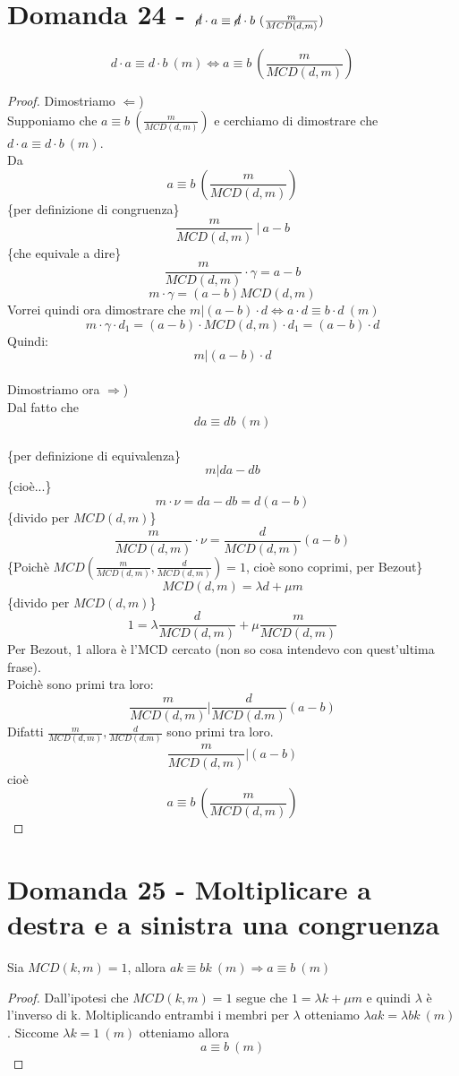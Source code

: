 \documentclass[]{article}
\begin{document}
\section{Domanda 24 - $\cancel{d}\cdot a \equiv \cancel{d} \cdot b\ (\frac{m}{MCD(d,m)})$}
$$d\cdot a \equiv d \cdot b \ (m) \Leftrightarrow a \equiv b \ \left( \frac{m}{MCD(d,m)} \right)$$
\begin{proof}
Dimostriamo $\Leftarrow$)\\
Supponiamo che $a \equiv b \ \left( \frac{m}{MCD(d,m)} \right)$ e cerchiamo di dimostrare che $d\cdot a \equiv d \cdot b \ (m)$.\\
Da $$ a \equiv b \ \left( \frac{m}{MCD(d,m)} \right) $$ \{per definizione di congruenza\}
$$ \frac{m}{MCD(d, m)}\ |\ a-b$$
\{che equivale a dire\}
$$\frac{m}{MCD(d,m)} \cdot \gamma = a -b$$
$$m \cdot \gamma = (a-b) MCD(d,m)$$
Vorrei quindi ora dimostrare che $ m | (a-b) \cdot d \Leftrightarrow a\cdot d \equiv b \cdot d \ (m) $
$$m\cdot  \gamma \cdot d_1 = (a-b)\cdot  MCD(d,m) \cdot d_1 = (a-b) \cdot d$$
Quindi:
$$ m | (a-b)\cdot d $$ \\
Dimostriamo ora $\Rightarrow$) \\
Dal fatto che $$da \equiv db \ (m)$$ \\
\{per definizione di equivalenza\}
$$m | da - db $$
\{cioè...\}
$$m\cdot \nu = da - db = d(a-b)$$
\{divido per $MCD(d,m)$\}
$$\frac{m}{MCD(d,m)} \cdot \nu = \frac{d}{MCD(d,m)}(a-b)$$
\{Poichè $MCD \left( \frac{m}{MCD(d,m)}, \frac{d}{MCD(d,m)}\right) = 1$, cioè sono coprimi, per Bezout\}
$$MCD(d,m) = \lambda d + \mu m$$
\{divido per $MCD(d,m)$\}
$$1 = \lambda \frac{d}{MCD(d,m)} + \mu \frac{m}{MCD(d,m)}$$
Per Bezout, 1 allora è l'MCD cercato (non so cosa intendevo con  quest'ultima frase).
\\Poichè sono primi tra loro:
$$\frac{m}{MCD(d,m)} | \frac{d}{MCD(d.m)}(a-b)$$
Difatti $\frac{m}{MCD(d,m)} , \frac{d}{MCD(d.m)}$ sono primi tra loro. 
$$\frac{m}{MCD(d,m)} | (a-b)$$ cioè $$a \equiv b \ \left(\frac{m}{MCD(d,m)}\right)$$
\end{proof}
\section{Domanda 25 - Moltiplicare a destra e a sinistra una congruenza}
\begin{lem} Sia $MCD(k,m) = 1$, allora $ak \equiv bk\ (m) \Rightarrow a\equiv b\ (m)$\end{lem}
\begin{proof} 
Dall'ipotesi che $MCD(k,m) = 1$ segue che $ 1 = \lambda k + \mu m$ e quindi $\lambda$ è l'inverso di k. Moltiplicando entrambi i membri per $\lambda$ otteniamo $\lambda a k = \lambda b k\ (m)$. Siccome $\lambda k = 1 \ (m)$ otteniamo allora $$a \equiv b \ (m)$$
\end{proof}
\end{document}

